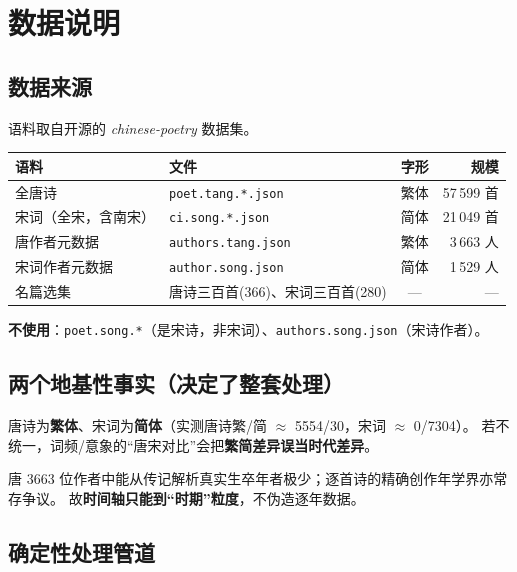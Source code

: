 \section{数据说明}

\subsection{数据来源}

语料取自开源的 \textit{chinese-poetry} 数据集。

\begin{table}[H]
\centering
\renewcommand{\arraystretch}{1.3}
\begin{tabular}{l l c r}
\toprule
语料 & 文件 & 字形 & 规模 \\
\midrule
全唐诗 & \texttt{poet.tang.*.json} & 繁体 & 57\,599 首 \\
宋词（全宋，含南宋） & \texttt{ci.song.*.json} & 简体 & 21\,049 首 \\
唐作者元数据 & \texttt{authors.tang.json} & 繁体 & 3\,663 人 \\
宋词作者元数据 & \texttt{author.song.json} & 简体 & 1\,529 人 \\
名篇选集 & 唐诗三百首(366)、宋词三百首(280) & --- & --- \\
\bottomrule
\end{tabular}
\end{table}

\noindent\textbf{不使用}：\texttt{poet.song.*}（是宋诗，非宋词）、\texttt{authors.song.json}（宋诗作者）。

\subsection{两个地基性事实（决定了整套处理）}

\begin{findbox}
唐诗为\textbf{繁体}、宋词为\textbf{简体}（实测唐诗繁/简 $\approx$ 5554/30，宋词 $\approx$ 0/7304）。
若不统一，词频/意象的“唐宋对比”会把\textbf{繁简差异误当时代差异}。
\end{findbox}

\begin{findbox}
唐 3663 位作者中能从传记解析真实生卒年者极少；逐首诗的精确创作年学界亦常存争议。
故\textbf{时间轴只能到“时期”粒度}，不伪造逐年数据。
\end{findbox}

\subsection{确定性处理管道}

